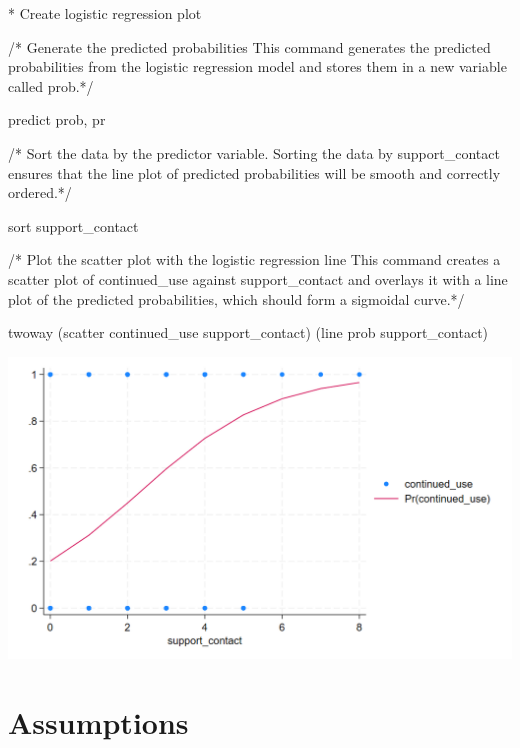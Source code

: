 \documentclass[
  letterpaper,
  DIV=11,
  numbers=noendperiod]{scrreprt}
\newenvironment{Shaded}{\begin{snugshade}}{\end{snugshade}}
\newcommand{\CommentTok}[1]{\textcolor[rgb]{0.37,0.37,0.37}{#1}}
\newcommand{\KeywordTok}[1]{\textcolor[rgb]{0.00,0.23,0.31}{#1}}
\newcommand{\NormalTok}[1]{\textcolor[rgb]{0.00,0.23,0.31}{#1}}
\begin{document}
\begin{Shaded}
\begin{Highlighting}[]
\NormalTok{* Create }\KeywordTok{logistic}\NormalTok{ regression plot }

\CommentTok{/* Generate the predicted probabilities}
\CommentTok{This command generates the predicted probabilities from the logistic regression model and stores them in a new variable called \textquotesingle{}prob\textquotesingle{}.*/}
  
\KeywordTok{predict} \KeywordTok{prob}\NormalTok{, pr}

\CommentTok{/* Sort the data by the predictor variable. Sorting the data by \textquotesingle{}support\_contact\textquotesingle{} ensures that the line plot of predicted probabilities will be smooth and correctly ordered.*/}
  
\KeywordTok{sort}\NormalTok{ support\_contact}

\CommentTok{/* Plot the scatter plot with the logistic regression line This command creates a scatter plot of \textquotesingle{}continued\_use\textquotesingle{} against \textquotesingle{}support\_contact\textquotesingle{} and overlays it with a line plot of the predicted probabilities, which should form a sigmoidal curve.*/}

\KeywordTok{twoway}\NormalTok{ (}\KeywordTok{scatter}\NormalTok{ continued\_use support\_contact) (}\KeywordTok{line} \KeywordTok{prob}\NormalTok{ support\_contact)}
\end{Highlighting}
\end{Shaded}

\includegraphics{images/log_regression_fitted.png}

\section{Assumptions}\label{assumptions-3}
\end{document}
